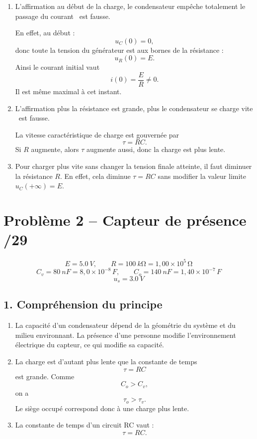 \documentclass[11pt,a4paper]{article}
\begin{document}
\begin{enumerate}
    \item L'affirmation \og au début de la charge, le condensateur empêche totalement le passage du courant \fg\ est fausse.

    En effet, au début :
    \[
    u_C(0)=0,
    \]
    donc toute la tension du générateur est aux bornes de la résistance :
    \[
    u_R(0)=E.
    \]
    Ainsi le courant initial vaut
    \[
    i(0)=\frac{E}{R}\neq 0.
    \]
    Il est même maximal à cet instant.

    \item L'affirmation \og plus la résistance est grande, plus le condensateur se charge vite \fg\ est fausse.

    La vitesse caractéristique de charge est gouvernée par
    \[
    \tau=RC.
    \]
    Si \(R\) augmente, alors \(\tau\) augmente aussi, donc la charge est plus lente.

    \item Pour charger plus vite sans changer la tension finale atteinte, il faut diminuer la résistance \(R\). En effet, cela diminue \(\tau=RC\) sans modifier la valeur limite \(u_C(+\infty)=E\).
\end{enumerate}

\newpage

\section*{Problème 2 -- Capteur de présence \hfill /29}

\[
E=\SI{5.0}{V},\qquad R=\SI{100}{k\ohm}=1{,}00\times10^5\,\si{\ohm}
\]
\[
C_v=\SI{80}{nF}=8{,}0\times10^{-8}\,\si{F},\qquad
C_o=\SI{140}{nF}=1{,}40\times10^{-7}\,\si{F}
\]
\[
u_s=\SI{3.0}{V}
\]

\subsection*{1. Compréhension du principe}

\begin{enumerate}
    \item La capacité d'un condensateur dépend de la géométrie du système et du milieu environnant. La présence d'une personne modifie l'environnement électrique du capteur, ce qui modifie sa capacité.

    \item La charge est d'autant plus lente que la constante de temps
    \[
    \tau=RC
    \]
    est grande. Comme
    \[
    C_o>C_v,
    \]
    on a
    \[
    \tau_o>\tau_v.
    \]
    Le siège occupé correspond donc à une charge plus lente.

    \item La constante de temps d'un circuit RC vaut :
    \[
    \tau=RC.
    \]
\end{enumerate}
\end{document}
